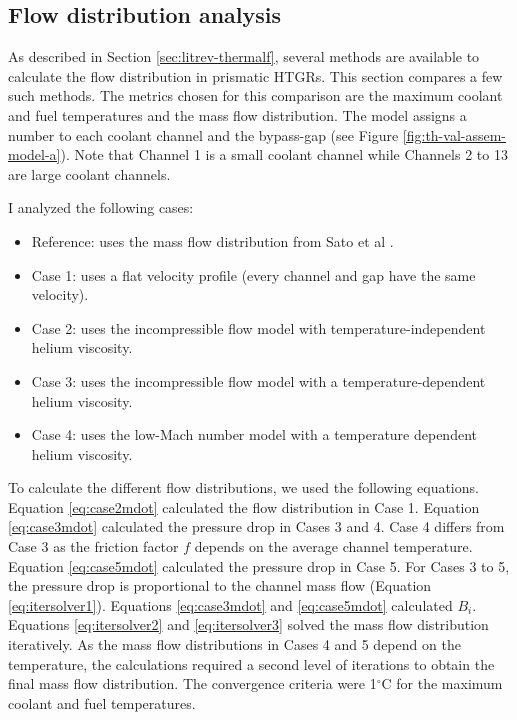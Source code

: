 \subsection{Flow distribution analysis}
\label{sec:flowdistrib}

As described in Section \ref{sec:litrev-thermalf}, several methods are available to calculate the flow distribution in prismatic HTGRs.
This section compares a few such methods.
The metrics chosen for this comparison are the maximum coolant and fuel temperatures and the mass flow distribution.
The model assigns a number to each coolant channel and the bypass-gap (see Figure \ref{fig:th-val-assem-model-a}).
Note that Channel 1 is a small coolant channel while Channels 2 to 13 are large coolant channels.

I analyzed the following cases:
\begin{itemize}
    \item Reference: uses the mass flow distribution from Sato et al \cite{sato_computational_2010}.
    \item Case 1: uses a flat velocity profile (every channel and gap have the same velocity).
    \item Case 2: uses the incompressible flow model with temperature-independent helium viscosity.
    \item Case 3: uses the incompressible flow model with a temperature-dependent helium viscosity.
    \item Case 4: uses the low-Mach number model with a temperature dependent helium viscosity.
\end{itemize}

To calculate the different flow distributions, we used the following equations.
Equation \ref{eq:case2mdot} calculated the flow distribution in Case 1.
Equation \ref{eq:case3mdot} \cite{melese_thermal_1984} calculated the pressure drop in Cases 3 and 4.
Case 4 differs from Case 3 as the friction factor $f$ depends on the average channel temperature.
Equation \ref{eq:case5mdot} \cite{melese_thermal_1984} calculated the pressure drop in Case 5.
For Cases 3 to 5, the pressure drop is proportional to the channel mass flow (Equation \ref{eq:itersolver1}).
Equations \ref{eq:case3mdot} and \ref{eq:case5mdot} calculated $B_i$.
Equations \ref{eq:itersolver2} and \ref{eq:itersolver3} \cite{melese_thermal_1984} solved the mass flow distribution iteratively.
As the mass flow distributions in Cases 4 and 5 depend on the temperature, the calculations required a second level of iterations to obtain the final mass flow distribution.
The convergence criteria were 1$^{\circ}$C for the maximum coolant and fuel temperatures.


